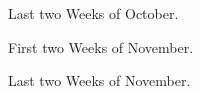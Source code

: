 \documentclass[]{final_report}
\begin{document}
\begin{figure}[h]
	\centering
	\fboxsep 2mm
	\caption{\label{fig:October2} Last two Weeks of October.}
\end{figure}

\begin{figure}[h]
	\centering
	\fboxsep 2mm
	\caption{\label{fig:November1} First two Weeks of November.}
\end{figure}

\begin{figure}[h]
	\centering
	\fboxsep 2mm
	\caption{\label{fig:November2} Last two Weeks of November.}
\end{figure}
\end{document}
